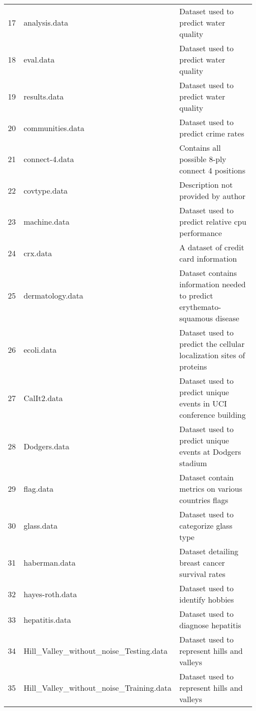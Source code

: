 \begin{table}
{\begin{tabular}{|l|l|l|}
17 &                            analysis.data &  Dataset used to predict water quality\\
18 &                                eval.data &  Dataset used to predict water quality\\
19 &                             results.data &  Dataset used to predict water quality\\
20 &                         communities.data &  Dataset used to predict crime rates\\
21 &                           connect-4.data &  Contains all possible 8-ply connect 4 positions\\
22 &                             covtype.data &  Description not provided by author\\
23 &                             machine.data &  Dataset used to predict relative cpu performance\\
24 &                                 crx.data &  A dataset of credit card information\\
25 &                         dermatology.data &  Dataset contains information needed to predict erythemato-squamous disease\\
26 &                               ecoli.data &  Dataset used to predict the cellular localization sites of proteins\\
27 &                              CalIt2.data &  Dataset used to predict unique events in UCI conference building\\
28 &                             Dodgers.data &  Dataset used to predict unique events at Dodgers stadium\\
29 &                                flag.data &  Dataset contain metrics on various countries flags\\
30 &                               glass.data &  Dataset used to categorize glass type\\
31 &                            haberman.data &  Dataset detailing breast cancer survival rates\\
32 &                          hayes-roth.data &  Dataset used to identify hobbies\\
33 &                           hepatitis.data &  Dataset used to diagnose hepatitis\\
34 &   Hill\_Valley\_without\_noise\_Testing.data & Dataset used to represent hills and valleys\\
35 &  Hill\_Valley\_without\_noise\_Training.data & Dataset used to represent hills and valleys\\

\end{tabular}}
\end{table}
